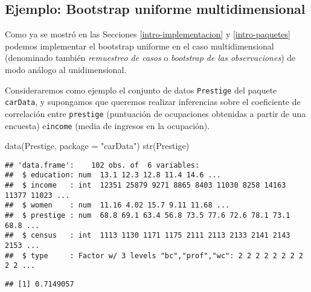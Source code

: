 \documentclass[
]{book}
\newenvironment{Shaded}{\begin{snugshade}}{\end{snugshade}}
\newcommand{\AttributeTok}[1]{\textcolor[rgb]{0.77,0.63,0.00}{#1}}
\newcommand{\CommentTok}[1]{\textcolor[rgb]{0.56,0.35,0.01}{\textit{#1}}}
\newcommand{\FunctionTok}[1]{\textcolor[rgb]{0.00,0.00,0.00}{#1}}
\newcommand{\NormalTok}[1]{#1}
\newcommand{\SpecialCharTok}[1]{\textcolor[rgb]{0.00,0.00,0.00}{#1}}
\newcommand{\StringTok}[1]{\textcolor[rgb]{0.31,0.60,0.02}{#1}}
\theoremstyle{break}
\theoremstyle{definition}
\theoremstyle{definition}
\theoremstyle{definition}
\theoremstyle{definition}
\theoremstyle{remark}
\begin{document}
\hypertarget{boot-unif-multi}{%
\subsection{Ejemplo: Bootstrap uniforme multidimensional}\label{boot-unif-multi}}

Como ya se mostró en las Secciones \ref{intro-implementacion} y \ref{intro-paquetes} podemos implementar el bootstrap uniforme en el caso multidimensional (denominado también \emph{remuestreo de casos} o \emph{bootstrap de las observaciones}) de modo análogo al unidimensional.

Consideraremos como ejemplo el conjunto de datos \texttt{Prestige} del paquete \texttt{carData}, y supongamos que queremos realizar inferencias sobre el coeficiente de correlación entre \texttt{prestige} (puntuación de ocupaciones obtenidas a partir de una encuesta) e\texttt{income} (media de ingresos en la ocupación).

\begin{Shaded}
\begin{Highlighting}[]
\FunctionTok{data}\NormalTok{(Prestige, }\AttributeTok{package =} \StringTok{"carData"}\NormalTok{)}
\FunctionTok{str}\NormalTok{(Prestige)}
\end{Highlighting}
\end{Shaded}

\begin{verbatim}
## 'data.frame':    102 obs. of  6 variables:
##  $ education: num  13.1 12.3 12.8 11.4 14.6 ...
##  $ income   : int  12351 25879 9271 8865 8403 11030 8258 14163 11377 11023 ...
##  $ women    : num  11.16 4.02 15.7 9.11 11.68 ...
##  $ prestige : num  68.8 69.1 63.4 56.8 73.5 77.6 72.6 78.1 73.1 68.8 ...
##  $ census   : int  1113 1130 1171 1175 2111 2113 2133 2141 2143 2153 ...
##  $ type     : Factor w/ 3 levels "bc","prof","wc": 2 2 2 2 2 2 2 2 2 2 ...
\end{verbatim}

\begin{Shaded}
\end{Shaded}

\begin{verbatim}
## [1] 0.7149057
\end{verbatim}
\end{document}
